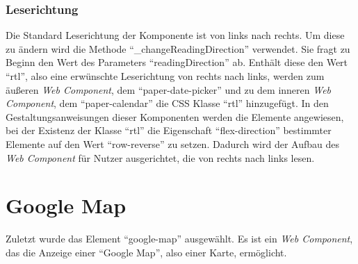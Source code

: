 \documentclass[12pt, paper=a4, bibtotoc, toc=listof, headsepline=true]{scrreprt}
\begin{document}
		\subsubsection{Leserichtung}
		Die Standard Leserichtung der Komponente ist von links nach rechts. Um diese zu ändern wird die Methode \enquote{\_changeReadingDirection} verwendet. Sie fragt zu Beginn den Wert des Parameters \enquote{readingDirection} ab.  Enthält diese den Wert \enquote{rtl}, also eine erwünschte Leserichtung von rechts nach links, werden zum äußeren \emph{Web Component}, dem \enquote{paper-date-picker} und zu dem inneren \emph{Web Component}, dem \enquote{paper-calendar} die \ac{CSS} Klasse \enquote{rtl} hinzugefügt. In den Gestaltungsanweisungen dieser Komponenten werden die Elemente angewiesen, bei der Existenz der Klasse \enquote{rtl} die Eigenschaft \enquote{flex-direction} bestimmter Elemente auf den Wert \enquote{row-reverse} zu setzen. Dadurch wird der Aufbau des \emph{Web Component} für Nutzer ausgerichtet, die von rechts nach links lesen.
		\newpage
	
	\section{Google Map}
	Zuletzt wurde das Element \enquote{google-map} ausgewählt. Es ist ein \emph{Web Component}, das die Anzeige einer \enquote{Google Map}, also einer Karte, ermöglicht\cite{gooMap}.
\end{document}
